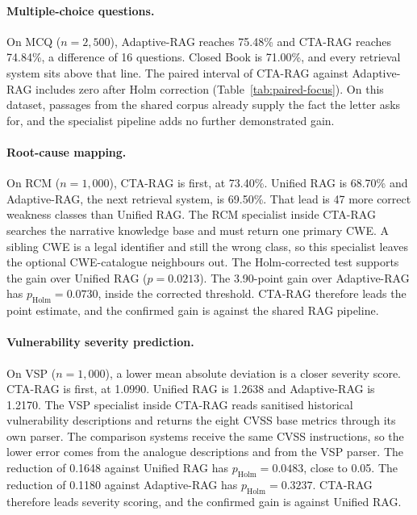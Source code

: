 \documentclass[5p,times,authoryear]{elsarticle}
\begin{document}
\paragraph{Multiple-choice questions.}
On MCQ ($n{=}2{,}500$), Adaptive-RAG reaches 75.48\% and CTA-RAG reaches 74.84\%, a difference of 16 questions. Closed Book is 71.00\%, and every retrieval system sits above that line. The paired interval of CTA-RAG against Adaptive-RAG includes zero after Holm correction (Table~\ref{tab:paired-focus}). On this dataset, passages from the shared corpus already supply the fact the letter asks for, and the specialist pipeline adds no further demonstrated gain.

\paragraph{Root-cause mapping.}
On RCM ($n{=}1{,}000$), CTA-RAG is first, at 73.40\%. Unified RAG is 68.70\% and Adaptive-RAG, the next retrieval system, is 69.50\%. That lead is 47 more correct weakness classes than Unified RAG. The RCM specialist inside CTA-RAG searches the narrative knowledge base and must return one primary CWE. A sibling CWE is a legal identifier and still the wrong class, so this specialist leaves the optional CWE-catalogue neighbours out. The Holm-corrected test supports the gain over Unified RAG ($p{=}0.0213$). The 3.90-point gain over Adaptive-RAG has $p_{\mathrm{Holm}}{=}0.0730$, inside the corrected threshold. CTA-RAG therefore leads the point estimate, and the confirmed gain is against the shared RAG pipeline.

\paragraph{Vulnerability severity prediction.}
On VSP ($n{=}1{,}000$), a lower mean absolute deviation is a closer severity score. CTA-RAG is first, at 1.0990. Unified RAG is 1.2638 and Adaptive-RAG is 1.2170. The VSP specialist inside CTA-RAG reads sanitised historical vulnerability descriptions and returns the eight CVSS base metrics through its own parser. The comparison systems receive the same CVSS instructions, so the lower error comes from the analogue descriptions and from the VSP parser. The reduction of 0.1648 against Unified RAG has $p_{\mathrm{Holm}}{=}0.0483$, close to 0.05. The reduction of 0.1180 against Adaptive-RAG has $p_{\mathrm{Holm}}{=}0.3237$. CTA-RAG therefore leads severity scoring, and the confirmed gain is against Unified RAG.
\end{document}
